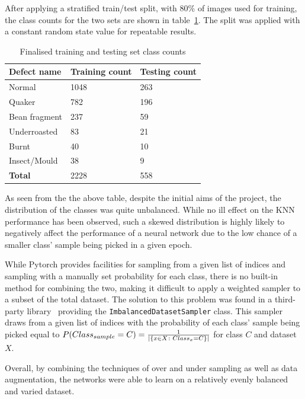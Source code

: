 After applying a stratified train/test split, with 80\% of images used for training, the class counts for the two sets are
shown in table~\ref{tab:finalTrainTestClassCuts}.
The split was applied with a constant random state value for repeatable results.
\begin{table}[h]
    \centering
    \begin{tabular}{lll}
        \toprule
        \textbf{Defect name} & \textbf{Training count} & \textbf{Testing count} \\
        \midrule
        Normal & 1048 & 263 \\
        Quaker & 782 & 196 \\
        Bean fragment & 237 & 59 \\
        Underroasted & 83 & 21 \\
        Burnt & 40 & 10 \\
        Insect/Mould & 38 & 9 \\
        \midrule
        \textbf{Total} & 2228 & 558 \\
        \bottomrule
    \end{tabular}
    \caption{Finalised training and testing set class counts}
    \label{tab:finalTrainTestClassCuts}
\end{table}

As seen from the the above table, despite the initial aims of the project, the distribution of the classes was quite unbalanced.
While no ill effect on the KNN performance has been observed, such a skewed distribution is highly likely to negatively
affect the performance of a neural network due to the low chance of a smaller class' sample being picked in a given epoch.

While Pytorch provides facilities for sampling from a given list of indices and sampling with a manually set probability for each class,
there is no built-in method for combining the two, making it difficult to apply a weighted sampler to a subset of the total dataset.
The solution to this problem was found in a third-party library~\cite{imbalancedSampler} providing the \verb|ImbalancedDatasetSampler| class.
This sampler draws from a given list of indices with the probability of each class' sample being picked equal to
$P(Class_{sample} = C) = \frac{1}{\arrowvert\{x \in X \colon Class_x = C\}\arrowvert}$ for class $C$ and dataset $X$.

Overall, by combining the techniques of over and under sampling as well as data augmentation, the networks were able to learn on a relatively
evenly balanced and varied dataset.
